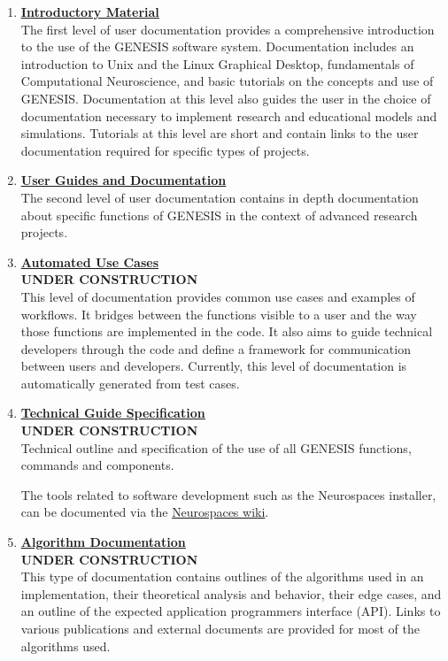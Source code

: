 \documentclass[12pt]{article}
\begin{document}
\begin{enumerate}

\item \href{../contents-level1/contents-level1.pdf}{\bf \underline{Introductory Material}}\\
The first level of user documentation provides a comprehensive introduction to the use of the GENESIS software system. Documentation includes an introduction to Unix and the Linux Graphical Desktop, fundamentals of Computational Neuroscience, and basic tutorials on the concepts and use of GENESIS. Documentation at this level also guides the user
  in the choice of documentation necessary to implement
  research and educational models and simulations.  Tutorials at this level
  are short and contain links to the user documentation required for
  specific types of projects.  

\item \href{../contents-level2/contents-level2.pdf}{\bf \underline{User Guides and Documentation}}\\
The second level of user documentation contains in depth
  documentation about specific functions of GENESIS in the context of
  advanced research projects.

\item \href{http://neurospaces.sourceforge.net/tests-menu.html}{\bf \underline{Automated Use Cases}}\\
 {\bf UNDER CONSTRUCTION}\\
  This level of documentation provides common use cases and examples of workflows. It bridges between the functions visible to
  a user and the way those functions are implemented in the code.
  It also aims to guide technical developers through the code
  and define a framework for communication between users and developers.
  Currently, this level of documentation is automatically generated
  from test cases.
  
 \item \href{../contents-level4/contents-level4.pdf}{\bf \underline{Technical Guide Specification}}\\
 {\bf UNDER CONSTRUCTION}\\
  Technical outline
  and specification of the use of all GENESIS functions, commands and
  components.

  The tools related to software development such as the Neurospaces
  installer, can be documented via the \href{http://code.google.com/p/neurospaces/wiki/Index}{Neurospaces wiki}.

\item \href{../contents-level5/contents-level5.pdf}{\bf \underline{Algorithm Documentation}} \\
{\bf UNDER CONSTRUCTION}\\
  This type of documentation contains outlines of the
  algorithms used in an implementation, their theoretical analysis
  and behavior, their edge cases, and an outline of the expected
  application programmers interface (API).  Links to various publications
  and external documents are provided for most of the algorithms
  used.


\end{enumerate}
\end{document}
